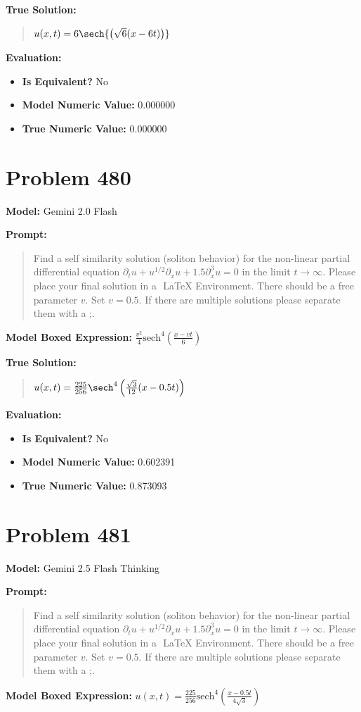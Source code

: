 \documentclass{article}
\begin{document}
\textbf{True Solution:}
\begin{quote}
$u(x,t) = 6 \sech{\left( \sqrt{6} (x - 6t) \right)}$
\end{quote}

\textbf{Evaluation:}
\begin{itemize}
\item \textbf{Is Equivalent?} No
\item \textbf{Model Numeric Value:} 0.000000
\item \textbf{True Numeric Value:} 0.000000
\end{itemize}
\vspace{1cm}
\section*{Problem 480}
\textbf{Model:} Gemini 2.0 Flash

\textbf{Prompt:}
\begin{quote}
Find a self similarity solution (soliton behavior) for the non-linear partial differential equation $ \partial_t u + u^{1/2} \partial_x u + 1.5\partial_x^3 u = 0 $ in the limit $t\to\infty$. Please place your final solution in a $\boxed{}$ LaTeX Environment. There should be a free parameter $v$. Set $v=0.5$. If there are multiple solutions please separate them with a ;.
\end{quote}
\textbf{Model Boxed Expression:} $\frac{v^2}{4} \mathrm{sech}^4\left( \frac{x-vt}{6} \right)$

\textbf{True Solution:}
\begin{quote}
$u(x,t) = \frac{225}{256} \sech^4\left( \frac{\sqrt{3}}{12}(x - 0.5t) \right)$
\end{quote}

\textbf{Evaluation:}
\begin{itemize}
\item \textbf{Is Equivalent?} No
\item \textbf{Model Numeric Value:} 0.602391
\item \textbf{True Numeric Value:} 0.873093
\end{itemize}
\vspace{1cm}
\section*{Problem 481}
\textbf{Model:} Gemini 2.5 Flash Thinking

\textbf{Prompt:}
\begin{quote}
Find a self similarity solution (soliton behavior) for the non-linear partial differential equation $ \partial_t u + u^{1/2} \partial_x u + 1.5\partial_x^3 u = 0 $ in the limit $t\to\infty$. Please place your final solution in a $\boxed{}$ LaTeX Environment. There should be a free parameter $v$. Set $v=0.5$. If there are multiple solutions please separate them with a ;.
\end{quote}
\textbf{Model Boxed Expression:} $u(x,t) = \frac{225}{256} \text{sech}^4\left(\frac{x-0.5t}{4\sqrt{3}}\right)$
\end{document}
